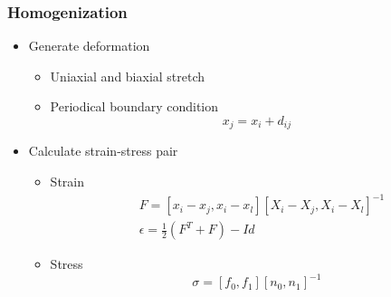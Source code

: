 \documentclass[serif,mathserif, 12pt]{beamer}
\begin{document}
\begin{frame}
  \frametitle{Homogenization}
  \begin{itemize}
  \item Generate deformation
    \begin{itemize}
    \item<1->[-] Uniaxial and biaxial stretch
    \item<2->[-] Periodical boundary condition
      \[x_j = x_i+d_{ij}\]
    \end{itemize}
  \item<3-> Calculate strain-stress pair
    \begin{itemize}
    \item<3->[-] Strain
      \[
      \begin{split}
        &F = [x_i-x_j, x_i-x_l][X_i-X_j, X_i-X_l]^{-1} \\
        &\epsilon = \frac{1}{2}(F^T+F)-Id
      \end{split}
      \]
    \item<4->[-] Stress
      \[
      \sigma = [f_0, f_1][n_0, n_1]^{-1}
      \]
    \end{itemize}
  \end{itemize}
\end{frame}
\end{document}
